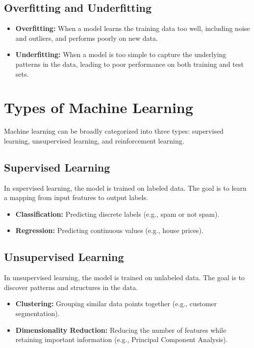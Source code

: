 \subsection{Overfitting and Underfitting}
\begin{itemize}
    \item \textbf{Overfitting:} When a model learns the training data too well, including noise and outliers, and performs poorly on new data.
    \item \textbf{Underfitting:} When a model is too simple to capture the underlying patterns in the data, leading to poor performance on both training and test sets.
\end{itemize}

\section{Types of Machine Learning}
Machine learning can be broadly categorized into three types: supervised learning, unsupervised learning, and reinforcement learning.

\subsection{Supervised Learning}
In supervised learning, the model is trained on labeled data. The goal is to learn a mapping from input features to output labels.

\begin{itemize}
    \item \textbf{Classification:} Predicting discrete labels (e.g., spam or not spam).
    \item \textbf{Regression:} Predicting continuous values (e.g., house prices).
\end{itemize}

\subsection{Unsupervised Learning}
In unsupervised learning, the model is trained on unlabeled data. The goal is to discover patterns and structures in the data.

\begin{itemize}
    \item \textbf{Clustering:} Grouping similar data points together (e.g., customer segmentation).
    \item \textbf{Dimensionality Reduction:} Reducing the number of features while retaining important information (e.g., Principal Component Analysis).
\end{itemize}

